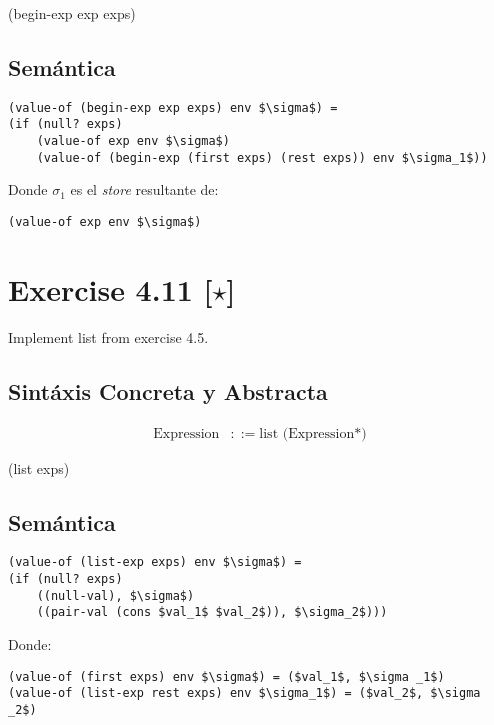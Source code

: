 \documentclass[11pt]{article}
\begin{document}
\begin{center}
(begin-exp exp exps)
\end{center}

\subsection*{Semántica}

\begin{lstlisting}[mathescape]
(value-of (begin-exp exp exps) env $\sigma$) =
(if (null? exps)
	(value-of exp env $\sigma$)
	(value-of (begin-exp (first exps) (rest exps)) env $\sigma_1$))
\end{lstlisting}
Donde $\sigma_1$ es el \textit{store} resultante de:
\begin{lstlisting}[mathescape]
(value-of exp env $\sigma$) 
\end{lstlisting}
\section*{Exercise 4.11 [$\star$]}
Implement list from exercise 4.5.
\subsection*{Sintáxis Concreta y Abstracta}
\begin{align*}
\text{Expression}	&::= \text{list (Expression*)}
\end{align*}

\begin{center}
(list exps)
\end{center}

\subsection*{Semántica}

\begin{lstlisting}[mathescape]
(value-of (list-exp exps) env $\sigma$) =
(if (null? exps)
	((null-val), $\sigma$)
	((pair-val (cons $val_1$ $val_2$)), $\sigma_2$)))
\end{lstlisting}
Donde:
\begin{lstlisting}[mathescape]
(value-of (first exps) env $\sigma$) = ($val_1$, $\sigma _1$)
(value-of (list-exp rest exps) env $\sigma_1$) = ($val_2$, $\sigma _2$)
\end{lstlisting}
\end{document}
